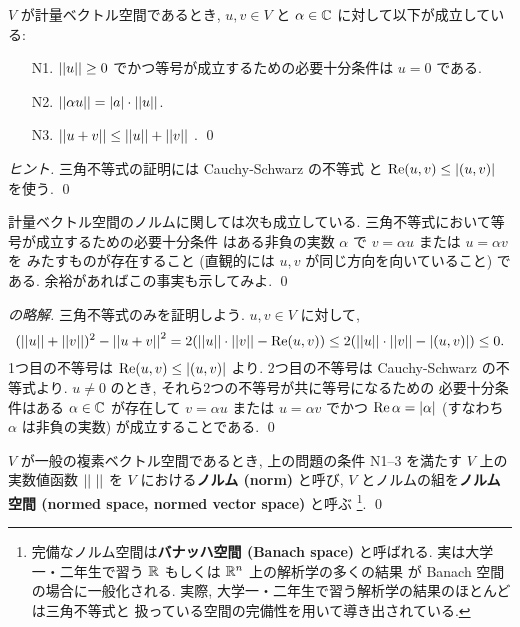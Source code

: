 \documentclass[12pt,twoside]{jarticle}
\newcommand\commentout[1]{#1}
\newcommand\commentout[1]{}
\begin{document}

\begin{question}[ノルムの基本性質]
\label{q:norm-axioms}
  $V$ が計量ベクトル空間であるとき, 
  $u,v\in V$ と $\alpha\in{\mathbb C}$ に対して以下が成立している:
  \begin{enumerate}
  \item[N1.] $\left|\left|u\right|\right|\ge 0$
    でかつ等号が成立するための必要十分条件は $u=0$ である.
  \item[N2.] $\left|\left|\alpha u\right|\right|=|a|\cdot\left|\left|u\right|\right|$.
  \item[N3.] $\left|\left|u+v\right|\right|\le\left|\left|u\right|\right|+\left|\left|v\right|\right|$
    . 
    \qed
  \end{enumerate}
\end{question}

\begin{proof}[ヒント]
  三角不等式の証明には Cauchy-Schwarz の不等式
  と $\mathop{\mathrm{Re}}\nolimits(u,v)\le|(u,v)|$ を使う.
  \qed
\end{proof}

\begin{rem}
  計量ベクトル空間のノルムに関しては次も成立している.
  三角不等式において等号が成立するための必要十分条件
  はある非負の実数 $\alpha$ で $v=\alpha u$ または $u=\alpha v$ を
  みたすものが存在すること
  (直観的には $u,v$ が同じ方向を向いていること) である.
  余裕があればこの事実も示してみよ.
  \qed
\end{rem}

\commentout{
\begin{proof}[の略解]
  三角不等式のみを証明しよう. $u,v\in V$ に対して,
  \begin{equation*}
    (\left|\left|u\right|\right|+\left|\left|v\right|\right|)^2 - \left|\left|u+v\right|\right|^2
    = 2(\left|\left|u\right|\right|\cdot\left|\left|v\right|\right| - \mathop{\mathrm{Re}}\nolimits(u,v))
    \le 2(\left|\left|u\right|\right|\cdot\left|\left|v\right|\right| - |(u,v)|)
    \le 0.
  \end{equation*}
  1つ目の不等号は $\mathop{\mathrm{Re}}\nolimits(u,v)\le|(u,v)|$ より.
  2つ目の不等号は Cauchy-Schwarz の不等式より.
  $u\ne 0$ のとき, それら2つの不等号が共に等号になるための
  必要十分条件はある $\alpha\in{\mathbb C}$ が存在して $v=\alpha u$ 
  または $u=\alpha v$ でかつ $\mathop{\mathrm{Re}}\nolimits\alpha = |\alpha|$ 
  (すなわち $\alpha$ は非負の実数) が成立することである.
  \qed
\end{proof}
}

\begin{guide}
  $V$ が一般の複素ベクトル空間であるとき, 
  上の問題の条件 N1--3 を満たす $V$ 上の実数値函数 $\left|\left|\ \right|\right|$ 
  を $V$ における{\bf ノルム (norm)} と呼び,
  $V$ とノルムの組を{\bf ノルム空間 (normed space, normed vector space)}
  と呼ぶ%
  \footnote{完備なノルム空間は{\bf バナッハ空間 (Banach space)} と呼ばれる.
    実は大学一・二年生で習う ${\mathbb R}$ もしくは ${\mathbb R}^n$ 上の解析学の多くの結果
    が Banach 空間の場合に一般化される.
    実際, 大学一・二年生で習う解析学の結果のほとんどは三角不等式と
    扱っている空間の完備性を用いて導き出されている.}.
  \qed
\end{guide}
\end{document}
